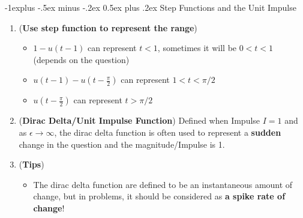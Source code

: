 \documentclass[10pt, landscape]{article}
\makeatletter
\renewcommand{\subsection}{\@startsection{subsection}{2}{0mm}%
                                {-1explus -.5ex minus -.2ex}%
                                {0.5ex plus .2ex}%
                                {\normalfont\normalsize\bfseries}}
\makeatother
\begin{document}
\begin{multicols}{4}
\subsection{Step Functions and the Unit Impulse}
\begin{enumerate}
    \item (\textbf{Use step function to represent the range})
    \begin{itemize}
        \item $1-u(t-1)$ can represent $t<1$, sometimes it will be $0<t<1$ (depends on the question)
        \item $u(t-1)-u(t-\frac{\pi}{2})$ can represent $1<t<\pi/2$
        \item $u(t-\frac{\pi}{2})$ can represent $t>\pi/2$
    \end{itemize}
    \item (\textbf{Dirac Delta/Unit Impulse Function}) Defined when Impulse $I=1$ and as $\epsilon\to\infty$, the dirac delta function is often used to represent a \textbf{sudden} change in the question and the magnitude/Impulse is 1.
    \item (\textbf{Tips})
    \begin{itemize}
        \item The dirac delta function are defined to be an instantaneous amount of change, but in problems, it should be considered as \textbf{a spike rate of change}!
    \end{itemize}
\end{enumerate}


\end{multicols}
\end{document}
